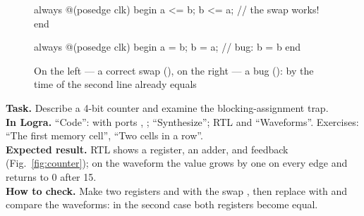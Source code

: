 \begin{figure}[H]
\centering
\begin{minipage}{0.47\textwidth}
\begin{vcode}
always @(posedge clk) begin
    a <= b;
    b <= a;   // the swap works!
end
\end{vcode}
\centering
{}
\end{minipage}\hfill
\begin{minipage}{0.47\textwidth}
\begin{vcode}
always @(posedge clk) begin
    a = b;
    b = a;    // bug: b = b
end
\end{vcode}
\centering
{}
\end{minipage}
\caption{On the left --- a correct swap (\code{<=}), on the right --- a bug (\code{=}):
by the time of the second line  already equals }
\end{figure}

\begin{diybox}
\textbf{Task.} Describe a 4-bit counter and examine the blocking-assignment trap.\\
\textbf{In Logra.} ``Code'':  with ports , ; ``Synthesize''; RTL and ``Waveforms''. Exercises: ``The first memory cell'', ``Two cells in a row''.\\
\textbf{Expected result.} RTL shows a register, an adder, and feedback (Fig.~\ref{fig:counter}); on the waveform the value grows by one on every edge and returns to 0 after 15.\\
\textbf{How to check.}  Make two registers  and  with the swap , then replace \code{<=} with \code{=} and compare the waveforms: in the second case both registers become equal.
\end{diybox}

